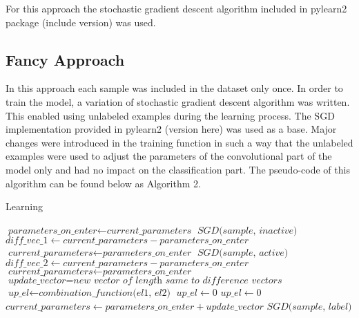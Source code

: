 \documentclass[a4paper,10pt]{report}
\begin{document}
      For this approach the stochastic gradient descent algorithm included in pylearn2 package (include version) was used. 
	  
      \subsection{Fancy Approach}
      In this approach each sample was included in the dataset only once. In order to train the model, a variation of stochastic gradient descent algorithm was written. This enabled using unlabeled examples during the learning process. The SGD implementation provided in pylearn2 (version here) was used as a base. Major changes were introduced in the training function in such a way that the unlabeled examples were used to adjust the parameters of the convolutional part of the model only and had no impact on the classification part. The pseudo-code of this algorithm can be found below as Algorithm 2. 
      
      \begin{algorithm}
      \caption{Learning}\label{euclid}
      \begin{algorithmic}[1]
	\State $\textit{parameters\_on\_enter} \gets \textit{current\_parameters}$
	\State
	\State $\textit{SGD(sample, inactive)}$
	\State $\textit{diff\_vec\_1} \gets \textit{current\_parameters} -\textit{parameters\_on\_enter}$
	\State $\textit{current\_parameters} \gets \textit{parameters\_on\_enter}$
	\State
	\State $\textit{SGD(sample, active)}$
	\State $\textit{diff\_vec\_2} \gets \textit{current\_parameters} - \textit{parameters\_on\_enter}$
	\State $\textit{current\_parameters} \gets \textit{parameters\_on\_enter}$
	\State
	\State $\textit{update\_vector} = \textit{new vector of length same to difference vectors}$
	    \State $\textit{up\_el} \gets \textit{combination\_function(el1, el2)}$
	  \Else
	    \State $\textit{up\_el} \gets 0$
	  \EndIf
	\EndFor
	\State
	    \State $\textit{up\_el} \gets 0$
	  \EndIf
	\EndFor
	\State
	\State $\textit{current\_parameters} \gets \textit{parameters\_on\_enter} + \textit{update\_vector}$
	\Else
	\State $\textit{SGD(sample, label)}$
      \EndIf
      \State
      \EndProcedure
      \end{algorithmic}
      \end{algorithm}
      
\end{document}
